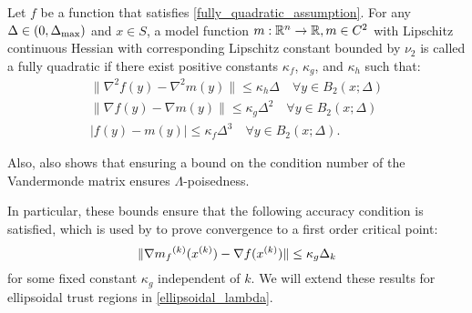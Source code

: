 \begin{definition}
\label{fully_quadratic_definition}
Let $f$ be a function that satisfies \cref{fully_quadratic_assumption}.
For any $\Delta \in (0, \Delta_{\text{max}})$ and $x \in S$, a model function $m : \mathbb R^n \to\mathbb R, m \in C^2$ with Lipschitz continuous Hessian with corresponding Lipschitz constant bounded by $\nu_2$  is called a fully quadratic if there exist positive constants
$\kappa_f$, $\kappa_g$, and $\kappa_h$ such that:
\begin{align}
\|\nabla^2 f(y) - \nabla^2 m(y)\| \le \kappa_{h} \Delta \quad \forall y \in B_2(x; \Delta) \label{error_in_hessian}\\
\|\nabla f(y) - \nabla m(y)\| \le \kappa_{g} \Delta^2 \quad \forall y \in B_2(x; \Delta) \label{error_in_gradient} \\
|f(y) - m(y) | \le \kappa_{f} \Delta^3 \quad \forall y \in B_2(x; \Delta). \label{error_in_function} 
\end{align}
\end{definition}

Also, \cite{DUMMY:intro_book} also shows that ensuring a bound on the condition number of the Vandermonde matrix ensures $\Lambda$-poisedness.

In particular, these bounds ensure that the following accuracy condition is satisfied, which is used by \cite{Conejo:2013:GCT:2620806.2621814} to prove convergence to a first order critical point: 
\begin{equation}
\label{accuracy}
\|\nabla {{m}_f}^{(k)}({x^{(k)}}) - \nabla f({x^{(k)}}) \| \le \kappa_g \Delta_k
\end{equation}
 for some fixed constant $\kappa_g$ independent of $k$.
We will extend these results for ellipsoidal trust regions in \cref{ellipsoidal_lambda}.
 

